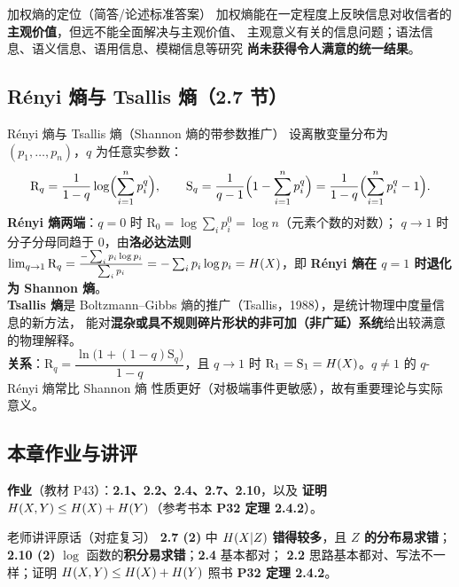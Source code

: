 \begin{warning}{加权熵的定位（简答/论述标准答案）}
加权熵能在一定程度上反映信息对收信者的\textbf{主观价值}，但远不能全面解决与主观价值、
主观意义有关的信息问题；语法信息、语义信息、语用信息、模糊信息等研究
\textbf{尚未获得令人满意的统一结果}。
\end{warning}

\subsection{Rényi 熵与 Tsallis 熵（2.7 节）}

\begin{defbox}{Rényi 熵与 Tsallis 熵（Shannon 熵的带参数推广）}
设离散变量分布为 $(p_1,\dots,p_n)$，$q$ 为任意实参数：
\[
\mathrm{R}_q=\frac{1}{1-q}\log\Bigl(\sum_{i=1}^{n}p_i^{q}\Bigr),
\qquad
\mathrm{S}_q=\frac{1}{q-1}\Bigl(1-\sum_{i=1}^{n}p_i^{q}\Bigr)
=\frac{1}{1-q}\Bigl(\sum_{i=1}^{n}p_i^{q}-1\Bigr).
\]
\textbf{Rényi 熵两端}：$q=0$ 时 $\mathrm{R}_0=\log\sum_i p_i^0=\log n$（元素个数的对数）；
$q\to1$ 时分子分母同趋于 $0$，由\textbf{洛必达法则}
$\lim_{q\to1}\mathrm{R}_q=\frac{-\sum_i p_i\log p_i}{\sum_i p_i}
=-\sum_i p_i\log p_i=H\!\left(X\right)$，即 \textbf{Rényi 熵在 $q=1$ 时退化为 Shannon 熵}。\\
\textbf{Tsallis 熵}是 Boltzmann--Gibbs 熵的推广（Tsallis，1988），是统计物理中度量信息的新方法，
能对\textbf{混杂或具不规则碎片形状的非可加（非广延）系统}给出较满意的物理解释。\\
\textbf{关系}：$\mathrm{R}_q=\dfrac{\ln\bigl(1+(1-q)\mathrm{S}_q\bigr)}{1-q}$，且
$q\to1$ 时 $\mathrm{R}_1=\mathrm{S}_1=H\!\left(X\right)$。$q\neq1$ 的 $q$-Rényi 熵常比 Shannon 熵
性质更好（对极端事件更敏感），故有重要理论与实际意义。
\end{defbox}

\subsection{本章作业与讲评}

\textbf{作业}（教材 P43）：\textbf{2.1、2.2、2.4、2.7、2.10}，以及
\textbf{证明 $H\!\left(X,Y\right)\le H\!\left(X\right)+H\!\left(Y\right)$}（参考书本 \textbf{P32 定理 2.4.2}）。

\begin{keypoint}{老师讲评原话（对症复习）}
\textbf{2.7 (2)} 中 $H\!\left(X|Z\right)$ \textbf{错得较多}，且 \textbf{$Z$ 的分布易求错}；
\textbf{2.10 (2)} $\log$ 函数的\textbf{积分易求错}；\textbf{2.4} 基本都对；
\textbf{2.2} 思路基本都对、写法不一样；证明 $H\!\left(X,Y\right)\le H\!\left(X\right)+H\!\left(Y\right)$ 照书
\textbf{P32 定理 2.4.2}。
\end{keypoint}

